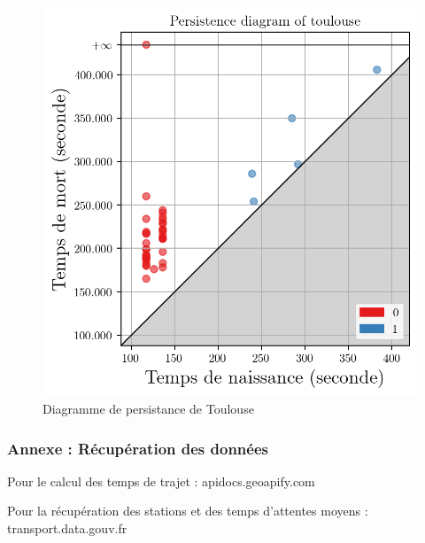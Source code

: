 \documentclass{beamer}
\begin{document}
\begin{frame}
\begin{figure}[h]
\begin{minipage}[c]{.45\linewidth}
            \includegraphics[width=1\textwidth]{../../Code/images/pd_toulouse.png}
            \caption{Diagramme de persistance de Toulouse}
        \end{minipage}
    \end{figure}
\end{frame}

\begin{frame}
    \frametitle{Annexe : Récupération des données}
    Pour le calcul des temps de trajet :  apidocs.geoapify.com

    Pour la récupération des stations et des temps d'attentes moyens : transport.data.gouv.fr
\end{frame}
\end{document}
